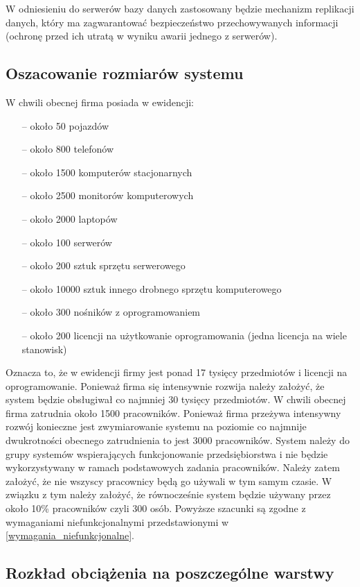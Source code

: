 W odniesieniu do serwerów bazy danych zastosowany będzie mechanizm replikacji danych, który ma zagwarantować bezpieczeństwo przechowywanych informacji (ochronę przed ich utratą w wyniku awarii jednego z serwerów).

\subsection{Oszacowanie rozmiarów systemu}

W chwili obecnej firma posiada w ewidencji:

\begin{itemize}
\item[--] około 50 pojazdów
\item[--] około 800 telefonów
\item[--] około 1500 komputerów stacjonarnych
\item[--] około 2500 monitorów komputerowych
\item[--] około 2000 laptopów
\item[--] około 100 serwerów
\item[--] około 200 sztuk sprzętu serwerowego
\item[--] około 10000 sztuk innego drobnego sprzętu komputerowego
\item[--] około 300 nośników z oprogramowaniem
\item[--] około 200 licencji na użytkowanie oprogramowania (jedna licencja na wiele stanowisk)
\end{itemize}

Oznacza to, że w ewidencji firmy jest ponad 17 tysięcy przedmiotów i
licencji na oprogramowanie. Ponieważ firma się intensywnie rozwija
należy założyć, że system będzie obsługiwał co najmniej 30 tysięcy
przedmiotów. W chwili obecnej firma zatrudnia około 1500
pracowników. Ponieważ firma przeżywa intensywny rozwój konieczne jest
zwymiarowanie systemu na poziomie co najmnije dwukrotności obecnego
zatrudnienia to jest 3000 pracowników. System należy do grupy systemów
wspierających funkcjonowanie przedsiębiorstwa i nie będzie
wykorzystywany w ramach podstawowych zadania pracowników. Należy zatem
założyć, że nie wszyscy pracownicy będą go używali w tym samym
czasie. W związku z tym należy założyć, że równocześnie system będzie
używany przez około 10\% pracowników czyli 300 osób. Powyższe szacunki
są zgodne z wymaganiami niefunkcjonalnymi przedstawionymi w
\ref{wymagania_niefunkcjonalne}.

\subsection{Rozkład obciążenia na poszczególne warstwy}

